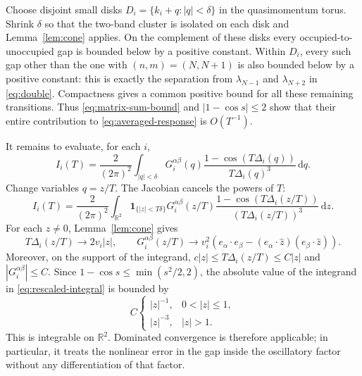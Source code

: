 \documentclass[11pt,a4paper]{article}
\numberwithin{equation}{section}
\newcommand{\R}{\mathbb R}
\newcommand{\one}{\mathbf 1}
\newcommand{\dd}{\,\mathrm d}
\theoremstyle{remark}
\begin{document}
Choose disjoint small disks $D_i=\{k_i+q:|q|<\delta\}$ in the
quasimomentum torus. Shrink $\delta$ so that the two-band cluster is
isolated on each disk and Lemma~\ref{lem:cone} applies. On the complement
of these disks every occupied-to-unoccupied gap is bounded below by
a positive constant. Within $D_i$, every such gap other than the one
with $(n,m)=(N,N+1)$ is also bounded below by a positive constant:
this is exactly the separation from $\lambda_{N-1}$ and
$\lambda_{N+2}$ in \eqref{eq:double}. Compactness gives a common
positive bound for all these remaining transitions. Thus
\eqref{eq:matrix-sum-bound} and $|1-\cos s|\leq2$ show that their
entire contribution to \eqref{eq:averaged-response} is $O(T^{-1})$.

It remains to evaluate, for each $i$,
\begin{equation}\label{eq:cone-integral}
 I_i(T)=\frac{2}{(2\pi)^2}\int_{|q|<\delta}
   G_i^{\alpha\beta}(q)
     \frac{1-\cos(T\Delta_i(q))}{T\Delta_i(q)^3}\dd q.
\end{equation}
Change variables $q=z/T$. The Jacobian cancels the powers of $T$:
\begin{equation}\label{eq:rescaled-integral}
 I_i(T)=\frac{2}{(2\pi)^2}\int_{\R^2}
   \one_{\{|z|<T\delta\}}G_i^{\alpha\beta}(z/T)
     \frac{1-\cos(T\Delta_i(z/T))}
          {(T\Delta_i(z/T))^3}\dd z.
\end{equation}
For each $z\ne0$, Lemma~\ref{lem:cone} gives
\[
 T\Delta_i(z/T)\longrightarrow2v_i|z|,\qquad
 G_i^{\alpha\beta}(z/T)\longrightarrow
 v_i^2\left(e_\alpha\cdot e_\beta
    -(e_\alpha\cdot\widehat z)(e_\beta\cdot\widehat z)\right).
\]
Moreover, on the support of the integrand,
$c|z|\leq T\Delta_i(z/T)\leq C|z|$ and $|G_i^{\alpha\beta}|\leq C$.
Since $1-\cos s\leq\min(s^2/2,2)$, the absolute value of the
integrand in \eqref{eq:rescaled-integral} is bounded by
\begin{equation}\label{eq:dominator}
 C\begin{cases}
        |z|^{-1},&0<|z|\leq1,\\
        |z|^{-3},&|z|>1.
   \end{cases}
\end{equation}
This is integrable on $\R^2$. Dominated convergence is therefore
applicable; in particular, it treats the nonlinear error in the gap
inside the oscillatory factor without any differentiation of that factor.
\end{document}
